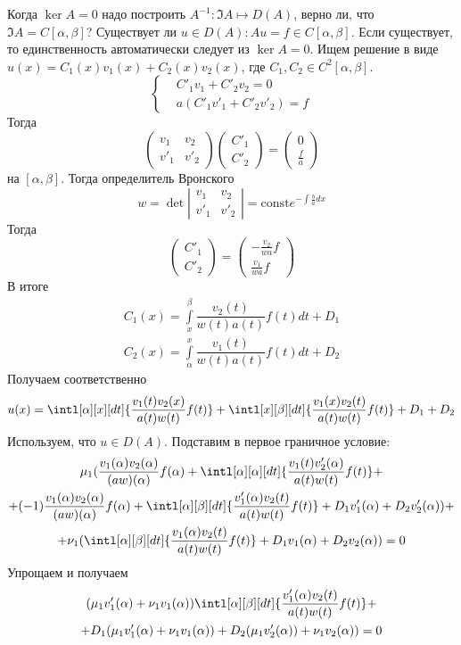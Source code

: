 \documentclass[14pt]{extarticle}
\newcommand{\vect}[2]{\left(
\begin{array}{c}
    #1\\
    #2
\end{array}\right)}
\begin{document}
Когда $\ker A = 0$ надо построить $A^{-1} : \Im A \mapsto D(A)$, 
верно ли, что $\Im A = C[\alpha, \beta]$?
Существует ли $u \in D(A)\colon Au = f \in C[\alpha, \beta]$.
Если существует, то единственность автоматически следует из $\ker A = 0$.
Ищем решение в виде $u(x) = C_1(x)v_1(x) + C_2(x)v_2(x)$, где $C_1, C_2 \in C^2[\alpha, \beta]$.
$$
\left\{
\begin{aligned}
    &C'_1 v_1 + C'_2 v_2 = 0\\
    &a(C'_1 v'_1 + C'_2 v'_2) = f
\end{aligned}
\right.
$$
Тогда
$$
\left(
\begin{array}{cc}
    v_1 & v_2\\
    v'_1 & v'_2
\end{array}
\right)
\vect{C'_1}{C'_2}
=
\vect{0}{\frac{f}{a}}
$$
на $[\alpha, \beta]$.
Тогда определитель Вронского
$$
w = \det \left|
\begin{array}{cc}
    v_1 & v_2\\
    v'_1 & v'_2
\end{array}
\right|
=
\mathrm{const} e^{-\int \frac{b}{a}dx}
$$
Тогда
$$
    \vect{C'_1}{C'_2} = \vect{-\frac{v_2}{wa}f}{\frac{v_1}{wa}f}
$$
В итоге
\begin{gather*}
    C_1(x) = \int \limits_x^\beta \dfrac{v_2(t)}{w(t)a(t)}f(t)dt + D_1\\
    C_2(x) = \int \limits_\alpha^x \dfrac{v_1(t)}{w(t)a(t)}f(t)dt + D_2
\end{gather*}
Получаем соответственно
$$
u(x) = \intl[\alpha][x][dt]{\dfrac{v_1(t) v_2(x)}{a(t) w(t)} f(t)} +
\intl[x][\beta][dt]{\dfrac{v_1(x) v_2(t)}{a(t) w(t)} f(t)} + D_1 + D_2
$$
Используем, что $u \in D(A)$.
Подставим в первое граничное условие:
\begin{multline*}
    \mu_1(\dfrac{v_1(\alpha) v_2(\alpha)}{(aw)(\alpha)} f(\alpha) +
    \intl[\alpha][\alpha][dt]{\dfrac{v_1(t) v'_2(\alpha)}{a(t) w(t)} f(t)} +\\+
    (-1)\dfrac{v_1(\alpha)v_2(\alpha)}{(aw)(\alpha)}f(\alpha) +
    \intl[\alpha][\beta][dt]{\dfrac{v'_1(\alpha) v_2(t)}{a(t) w(t)} f(t)} +
    D_1 v'_1(\alpha) + D_2 v'_2(\alpha)) +\\+
    \nu_1 (\intl[\alpha][\beta][dt]{\dfrac{v_1(\alpha) v_2(t)}{a(t) w(t)} f(t)} +
    D_1 v_1(\alpha) + D_2 v_2(\alpha)
    ) = 0
\end{multline*}
Упрощаем и получаем
\begin{multline*}
    (\mu_1 v'_1(\alpha) + \nu_1 v_1(\alpha))
    \intl[\alpha][\beta][dt]{\dfrac{v'_1(\alpha) v_2(t)}{a(t) w(t)} f(t)} +\\+
    D_1 (\mu_1 v'_1(\alpha) + \nu_1 v_1(\alpha)) +
    D_2 (\mu_1 v'_2(\alpha)) + \nu_1 v_2(\alpha))
    = 0
\end{multline*}
\end{document}
